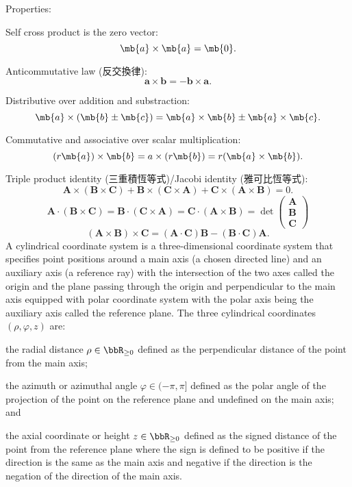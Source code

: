 \documentclass[a4paper,12pt]{report}
\begin{document}
Properties:
\bit
\item Self cross product is the zero vector:
\[\mb{a}\times\mb{a}=\mb{0}.\]
\item Anticommutative law (反交換律):
\[\mathbf{a}\times\mathbf{b}=-\mathbf{b}\times\mathbf{a}.\]
\item Distributive over addition and substraction:
\[\mb{a}\times(\mb{b}\pm\mb{c})=\mb{a}\times\mb{b}\pm\mb{a}\times\mb{c}.\]
\item Commutative and associative over scalar multiplication:
\[(r\mb{a})\times\mb{b}=a\times(r\mb{b})=r(\mb{a}\times\mb{b}).\]
\item Triple product identity (三重積恆等式)/Jacobi identity (雅可比恆等式):
\[\mathbf{A}\times(\mathbf{B}\times\mathbf{C})+\mathbf{B}\times(\mathbf{C}\times\mathbf{A})+\mathbf{C}\times(\mathbf{A}\times\mathbf{B})=0.\]
\[\mathbf{A}\cdot(\mathbf{B}\times\mathbf{C})=\mathbf{B}\cdot(\mathbf{C}\times\mathbf{A})=\mathbf{C}\cdot(\mathbf{A}\times\mathbf{B})=\det\begin{pmatrix}\mathbf{A}\\\mathbf{B}\\\mathbf{C}\end{pmatrix}\]
\[(\mathbf{A}\times\mathbf{B})\times\mathbf{C}=(\mathbf{A}\cdot\mathbf{C})\mathbf{B}-(\mathbf{B}\cdot\mathbf{C})\mathbf{A}.\]
\eit
{}
A cylindrical coordinate system is a three-dimensional coordinate system that specifies point positions around a main axis (a chosen directed line) and an auxiliary axis (a reference ray) with the intersection of the two axes called the origin and the plane passing through the origin and perpendicular to the main axis equipped with polar coordinate system with the polar axis being the auxiliary axis called the reference plane. The three cylindrical coordinates $(\rho,\varphi,z)$ are:
\bit
\item the radial distance $\rho\in\bbR_{\geq 0}$ defined as the perpendicular distance of the point from the main axis;
\item the azimuth or azimuthal angle $\varphi\in(-\pi,\pi]$ defined as the polar angle of the projection of the point on the reference plane and undefined on the main axis; and
\item the axial coordinate or height $z\in\bbR_{\geq 0}$ defined as the signed distance of the point from the reference plane where the sign is defined to be positive if the direction is the same as the main axis and negative if the direction is the negation of the direction of the main axis.
\end{document}
